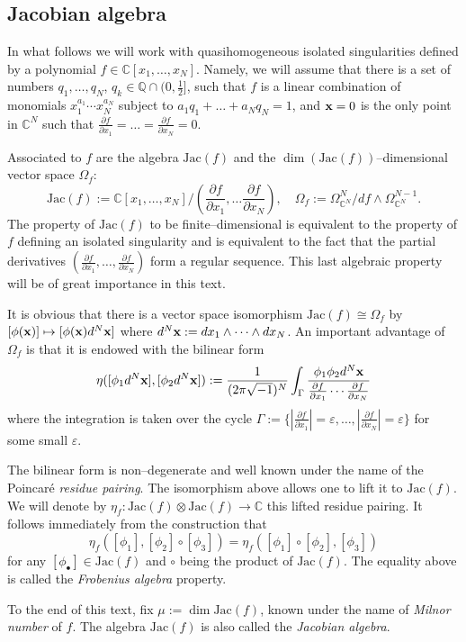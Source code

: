 \documentclass[12pt,a4paper]{amsart}
\newcommand{\CC}{{\mathbb{C}}}
\newcommand{\QQ}{{\mathbb{Q}}}
\newcommand{\Jac}{\mathrm{Jac}}
\newcommand{\bx}{{\bf x}}
\newcommand{\p}{{\partial}}
\newcommand{\<}{\left<}
\renewcommand{\>}{\right>}
\newcommand{\eps}{\varepsilon}
\numberwithin{equation}{section}
\begin{document}
\subsection{Jacobian algebra}
In what follows we will work with quasihomogeneous isolated singularities defined by a polynomial $f \in \CC[x_1,\dots,x_N]$.
Namely, we will assume that there is a set of numbers $q_1,\dots,q_N$, $q_k \in \QQ \cap (0,\frac{1}{2}]$, such that $f$ is a linear combination of monomials $x_1^{a_1}\cdots x_N^{a_N}$ subject to $a_1 q_1 + \dots + a_N q_N = 1$, and $\bx = 0$ is the only point in $\CC^N$ such that $\frac{\p f}{\p x_1} = \dots = \frac{\p f}{\p x_N} = 0$.

Associated to $f$ are the algebra $\Jac(f)$ and the $\dim(\Jac(f))$--dimensional vector space $\Omega_f$:
\[
 \Jac(f) := \CC[x_1,\dots,x_N] / (\frac{\p f}{\p x_1},\dots \frac{\p f}{\p x_N}), \quad
 \Omega_f := \Omega^{N}_{\CC^N} / df \wedge \Omega^{N-1}_{\CC^N}.
\]
The property of $\Jac(f)$ to be finite--dimensional is equivalent to the property of $f$ defining an isolated singularity and is equivalent to the fact that the partial derivatives $(\frac{\p f}{\p x_1}, \dots, \frac{\p f}{\p x_N})$ form a regular sequence. This last algebraic property will be of great importance in this text.

It is obvious that there is a vector space isomorphism $\Jac(f) \cong \Omega_f$ by $[\phi(\bx)] \mapsto [\phi(\bx) d^N\bx]$ where $d^N\bx := dx_1\wedge \dots \wedge dx_N$. An important advantage of $\Omega_f$ is that it is endowed with the bilinear form
\[
 \eta([\phi_1 d^N\bx],[\phi_2 d^N\bx]) := \frac{1}{(2 \pi \sqrt{-1})^N} \int_\Gamma \frac{\phi_1\phi_2 d^N\bx}{\frac{\p f}{\p x_1} \cdots \frac{\p f}{\p x_N}}
\]
where the integration is taken over the cycle $\Gamma := \lbrace |\frac{\p f}{\p x_1}| = \eps, \dots, |\frac{\p f}{\p x_N}| = \eps \rbrace $ for some small $\eps$.

The bilinear form is non--degenerate and well known under the name of the Poincar\'e \textit{residue pairing}. The isomorphism above allows one to lift it to $\Jac(f)$. We will denote by $\eta_f: \Jac(f) \otimes \Jac(f) \to \CC$ this lifted residue pairing. It follows immediately from the construction that
\[
 \eta_f([\phi_1],[\phi_2] \circ [\phi_3]) = \eta_f([\phi_1] \circ [\phi_2], [\phi_3])
\]
for any $[\phi_\bullet] \in \Jac(f)$ and $\circ$ being the product of $\Jac(f)$. The equality above is called the \textit{Frobenius algebra} property.

To the end of this text, fix $\mu := \dim \Jac(f)$, known under the name of \textit{Milnor number} of $f$. The algebra $\Jac(f)$ is also called the \textit{Jacobian algebra}.
\end{document}
